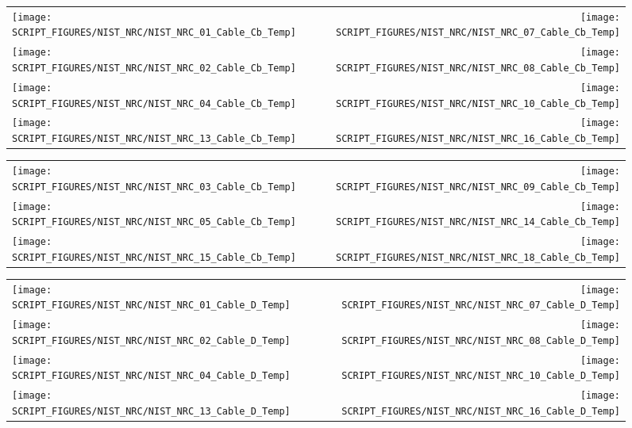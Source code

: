 \begin{figure}[!ht]
\begin{tabular*}{\textwidth}{l@{\extracolsep{\fill}}r}
\texttt{[image: SCRIPT\_FIGURES/NIST\_NRC/NIST\_NRC\_01\_Cable\_Cb\_Temp]} &
\texttt{[image: SCRIPT\_FIGURES/NIST\_NRC/NIST\_NRC\_07\_Cable\_Cb\_Temp]} \\
\texttt{[image: SCRIPT\_FIGURES/NIST\_NRC/NIST\_NRC\_02\_Cable\_Cb\_Temp]} &
\texttt{[image: SCRIPT\_FIGURES/NIST\_NRC/NIST\_NRC\_08\_Cable\_Cb\_Temp]} \\
\texttt{[image: SCRIPT\_FIGURES/NIST\_NRC/NIST\_NRC\_04\_Cable\_Cb\_Temp]} &
\texttt{[image: SCRIPT\_FIGURES/NIST\_NRC/NIST\_NRC\_10\_Cable\_Cb\_Temp]} \\
\texttt{[image: SCRIPT\_FIGURES/NIST\_NRC/NIST\_NRC\_13\_Cable\_Cb\_Temp]} &
\texttt{[image: SCRIPT\_FIGURES/NIST\_NRC/NIST\_NRC\_16\_Cable\_Cb\_Temp]}
\end{tabular*}
\label{NIST_NRC_Cable_Cb_Closed}
\end{figure}

\clearpage

\begin{figure}[!ht]
\begin{tabular*}{\textwidth}{l@{\extracolsep{\fill}}r}
\texttt{[image: SCRIPT\_FIGURES/NIST\_NRC/NIST\_NRC\_03\_Cable\_Cb\_Temp]} &
\texttt{[image: SCRIPT\_FIGURES/NIST\_NRC/NIST\_NRC\_09\_Cable\_Cb\_Temp]} \\
\texttt{[image: SCRIPT\_FIGURES/NIST\_NRC/NIST\_NRC\_05\_Cable\_Cb\_Temp]} &
\texttt{[image: SCRIPT\_FIGURES/NIST\_NRC/NIST\_NRC\_14\_Cable\_Cb\_Temp]} \\
\texttt{[image: SCRIPT\_FIGURES/NIST\_NRC/NIST\_NRC\_15\_Cable\_Cb\_Temp]} &
\texttt{[image: SCRIPT\_FIGURES/NIST\_NRC/NIST\_NRC\_18\_Cable\_Cb\_Temp]}
\end{tabular*}
\label{NIST_NRC_Cable_Cb_Open}
\end{figure}

\begin{figure}[!ht]
\begin{tabular*}{\textwidth}{l@{\extracolsep{\fill}}r}
\texttt{[image: SCRIPT\_FIGURES/NIST\_NRC/NIST\_NRC\_01\_Cable\_D\_Temp]} &
\texttt{[image: SCRIPT\_FIGURES/NIST\_NRC/NIST\_NRC\_07\_Cable\_D\_Temp]} \\
\texttt{[image: SCRIPT\_FIGURES/NIST\_NRC/NIST\_NRC\_02\_Cable\_D\_Temp]} &
\texttt{[image: SCRIPT\_FIGURES/NIST\_NRC/NIST\_NRC\_08\_Cable\_D\_Temp]} \\
\texttt{[image: SCRIPT\_FIGURES/NIST\_NRC/NIST\_NRC\_04\_Cable\_D\_Temp]} &
\texttt{[image: SCRIPT\_FIGURES/NIST\_NRC/NIST\_NRC\_10\_Cable\_D\_Temp]} \\
\texttt{[image: SCRIPT\_FIGURES/NIST\_NRC/NIST\_NRC\_13\_Cable\_D\_Temp]} &
\texttt{[image: SCRIPT\_FIGURES/NIST\_NRC/NIST\_NRC\_16\_Cable\_D\_Temp]}
\end{tabular*}
\label{NIST_NRC_Cable_D_Closed}
\end{figure}

